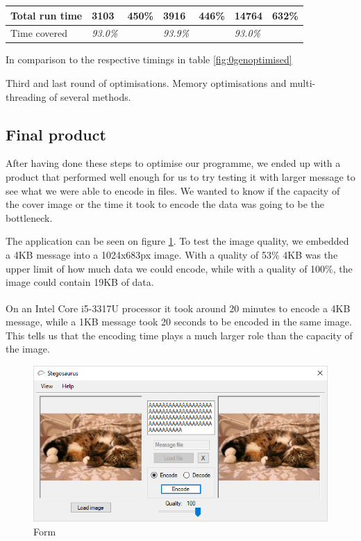 \begin{threeparttable}[]
{\begin{tabular}{|p{2.8cm}|p{1.9cm}|p{1.4cm}|p{1.9cm}|p{1.4cm}|p{1.8cm}|p{1.5cm}|}
        Total run time  & \textbf{3103} & \textbf{450\%} & \textbf{3916} & \textbf{446\%} & \textbf{14764} & \textbf{632\%} \\ \hline
        Time covered    & \textit{93.0\%} &     & \textit{93.9\%} &     & \textit{93.0\%} &	\\ \hline
    \end{tabular}
    }
    \begin{tablenotes}
        \footnotesize{\item[\textdagger] In comparison to the respective timings in table \ref{fig:0genoptimised}}
    \end{tablenotes}
    \caption{Third and last round of optimisations. Memory optimisations and multi-threading of several methods.}
    \label{fig:3genoptimised}
\end{threeparttable}

\subsection{Final product}
After having done these steps to optimise our programme, we ended up with a product that performed well enough for us to try testing it with larger message to see what we were able to encode in files.
We wanted to know if the capacity of the cover image or the time it took to encode the data was going to be the bottleneck.

The application can be seen on figure \ref{fig:formApp}. To test the image quality, we embedded a 4KB message into a 1024x683px image. With a quality of 53\% 4KB was the upper limit of how much data we could encode, while with a quality of 100\%, the image could contain 19KB of data.

On an Intel\textsuperscript{\textregistered} Core\textsuperscript{\textregistered} i5-3317U processor it took around 20 minutes to encode a 4KB message, while a 1KB message took 20 seconds to be encoded in the same image. This tells us that the encoding time plays a much larger role than the capacity of the image.

\begin{figure}
	\centering
	\includegraphics[width=.7\textwidth]{figures/formShown.png}
	\caption{Form}
	\label{fig:formApp}
\end{figure}

